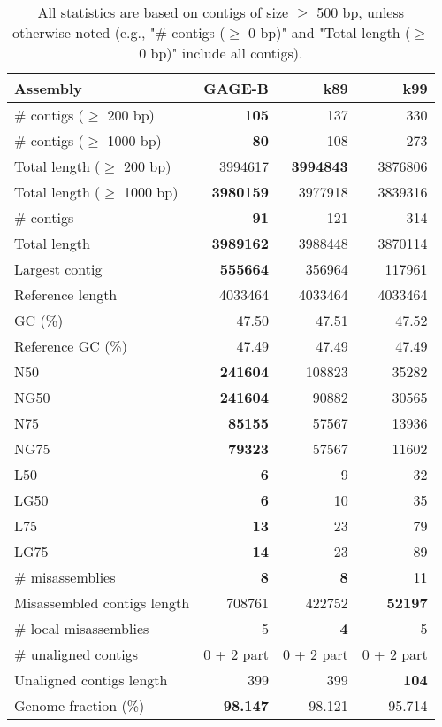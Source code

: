 \documentclass[12pt,a4paper]{article}
\begin{document}
\begin{table}[ht]
\begin{center}
\caption{All statistics are based on contigs of size $\geq$ 500 bp, unless otherwise noted (e.g., "\# contigs ($\geq$ 0 bp)" and "Total length ($\geq$ 0 bp)" include all contigs).}
\begin{tabular}{|l*{3}{|r}|}
\hline
Assembly & GAGE-B & k89 & k99 \\ \hline
\# contigs ($\geq$ 200 bp) & {\bf 105} & 137 & 330 \\ \hline
\# contigs ($\geq$ 1000 bp) & {\bf 80} & 108 & 273 \\ \hline
Total length ($\geq$ 200 bp) & 3994617 & {\bf 3994843} & 3876806 \\ \hline
Total length ($\geq$ 1000 bp) & {\bf 3980159} & 3977918 & 3839316 \\ \hline
\# contigs & {\bf 91} & 121 & 314 \\ \hline
Total length & {\bf 3989162} & 3988448 & 3870114 \\ \hline
Largest contig & {\bf 555664} & 356964 & 117961 \\ \hline
Reference length & 4033464 & 4033464 & 4033464 \\ \hline
GC (\%) & 47.50 & 47.51 & 47.52 \\ \hline
Reference GC (\%) & 47.49 & 47.49 & 47.49 \\ \hline
N50 & {\bf 241604} & 108823 & 35282 \\ \hline
NG50 & {\bf 241604} & 90882 & 30565 \\ \hline
N75 & {\bf 85155} & 57567 & 13936 \\ \hline
NG75 & {\bf 79323} & 57567 & 11602 \\ \hline
L50 & {\bf 6} & 9 & 32 \\ \hline
LG50 & {\bf 6} & 10 & 35 \\ \hline
L75 & {\bf 13} & 23 & 79 \\ \hline
LG75 & {\bf 14} & 23 & 89 \\ \hline
\# misassemblies & {\bf 8} & {\bf 8} & 11 \\ \hline
Misassembled contigs length & 708761 & 422752 & {\bf 52197} \\ \hline
\# local misassemblies & 5 & {\bf 4} & 5 \\ \hline
\# unaligned contigs & 0 + 2 part & 0 + 2 part & 0 + 2 part \\ \hline
Unaligned contigs length & 399 & 399 & {\bf 104} \\ \hline
Genome fraction (\%) & {\bf 98.147} & 98.121 & 95.714 \\ \hline

\end{tabular}
\end{center}
\end{table}
\end{document}
